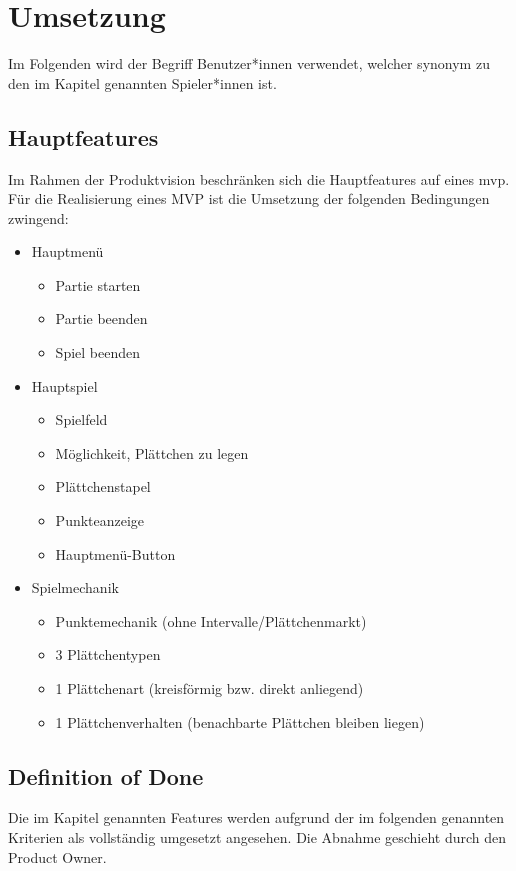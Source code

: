 \documentclass[../main.tex]{subfiles}
\begin{document}
	\section{Umsetzung}
	Im Folgenden wird der Begriff Benutzer*innen verwendet, welcher synonym zu den im Kapitel  genannten Spieler*innen ist.
	
	\subsection{Hauptfeatures}
	\label{section:Hauptfeatures}
	\par Im Rahmen der Produktvision beschränken sich die Hauptfeatures auf eines \gls{mvp}. Für die Realisierung eines MVP ist die Umsetzung der folgenden Bedingungen zwingend:
	\begin{itemize}
		\item Hauptmenü
		\begin{itemize}
			\item Partie starten
			\item Partie beenden
			\item Spiel beenden
		\end{itemize}
		\item Hauptspiel
		\begin{itemize}
			\item Spielfeld
			\item Möglichkeit, Plättchen zu legen
			\item Plättchenstapel
			\item Punkteanzeige
			\item Hauptmenü-Button
		\end{itemize}
		\item Spielmechanik
		\begin{itemize}
			\item Punktemechanik (ohne Intervalle/Plättchenmarkt)
			\item 3 Plättchentypen
			\item 1 Plättchenart (kreisförmig bzw. direkt anliegend)
			\item 1 Plättchenverhalten (benachbarte Plättchen bleiben liegen)
		\end{itemize}
	\end{itemize}

	\subsection{Definition of Done}
	\label{section:DefinitionOfDone}
	\par Die im Kapitel  genannten Features werden aufgrund der im folgenden genannten Kriterien als vollständig umgesetzt angesehen. Die Abnahme geschieht durch den Product Owner.
	
\end{document}
